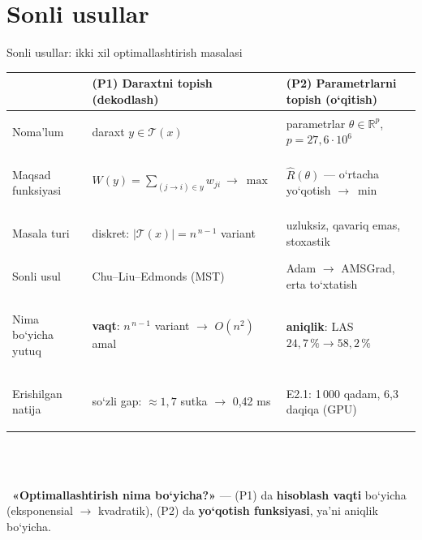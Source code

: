 \documentclass[aspectratio=169,11pt]{beamer}
\gdef\yangiliknum{}
\newcommand{\yangilik}[1]{\gdef\yangiliknum{#1}}
\newcommand{\R}{\mathbb{R}}
\begin{document}
\section{Sonli usullar}
\begin{frame}{Sonli usullar: ikki xil optimallashtirish masalasi}
  \centering
  \renewcommand{\arraystretch}{1.22}
  \footnotesize
  \begin{tabular}{@{}>{\bfseries\raggedright\arraybackslash}p{3.3cm}>{\raggedright\arraybackslash}p{5.1cm}>{\raggedright\arraybackslash}p{5.1cm}@{}}
    \toprule
    & {\color{bmain}\textbf{(P1) Daraxtni topish (dekodlash)}} & {\color{bmain}\textbf{(P2) Parametrlarni topish (o‘qitish)}}\\
    \midrule
    Noma’lum & daraxt $y\in\mathcal T(x)$ & parametrlar $\theta\in\R^{p}$, \ $p=27{,}6\cdot10^{6}$\\
    Maqsad funksiyasi & $W(y)=\sum_{(j\to i)\in y}w_{ji}\ \to\ \max$ & $\widehat R(\theta)$ --- o‘rtacha yo‘qotish $\to\ \min$\\
    Masala turi & diskret: $|\mathcal T(x)|=n^{\,n-1}$ variant & uzluksiz, qavariq emas, stoxastik\\
    Sonli usul & Chu--Liu--Edmonds (MST) & Adam $\to$ AMSGrad, erta to‘xtatish\\
    \textcolor{accent!85!black}{Nima bo‘yicha yutuq} & \textcolor{accent!85!black}{\textbf{vaqt}: $n^{\,n-1}$ variant $\to$ $O(n^2)$ amal} & \textcolor{accent!85!black}{\textbf{aniqlik}: LAS $24{,}7\,\%\to58{,}2\,\%$}\\
    \textcolor{accent!85!black}{Erishilgan natija} & 11 so‘zli gap: $\approx1{,}7$ sutka $\to$ 0,42 ms & E2.1: 1\,000 qadam, 6,3 daqiqa (GPU)\\
    \bottomrule
  \end{tabular}\\[7pt]
  \\[4pt]
  {\scriptsize\faQuestionCircle\ \textbf{«Optimallashtirish nima bo‘yicha?»} --- (P1) da \textbf{hisoblash vaqti} bo‘yicha (eksponensial $\to$ kvadratik), (P2) da \textbf{yo‘qotish funksiyasi}, ya’ni aniqlik bo‘yicha.}
\yangilik{3, 4}
\end{frame}
\end{document}

